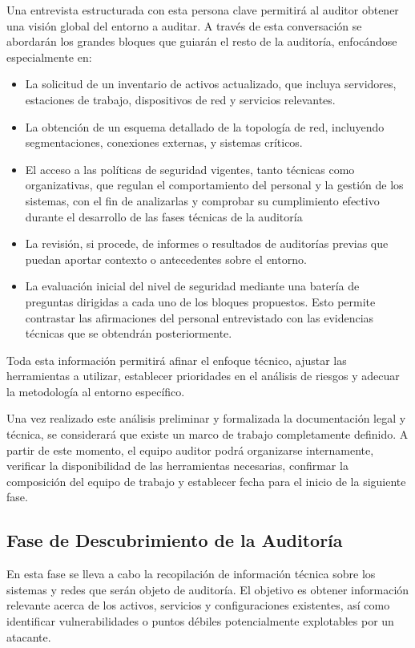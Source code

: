 \documentclass[a4paper, 11pt]{article}
\begin{document}
Una entrevista estructurada con esta persona clave permitirá al auditor obtener una visión global del entorno a auditar. A través de esta conversación se abordarán los grandes bloques que guiarán el resto de la auditoría, enfocándose especialmente en:

\begin{itemize}
\item La solicitud de un inventario de activos actualizado, que incluya servidores, estaciones de trabajo, dispositivos de red y servicios relevantes.
\item La obtención de un esquema detallado de la topología de red, incluyendo segmentaciones, conexiones externas, y sistemas críticos.
\item El acceso a las políticas de seguridad vigentes, tanto técnicas como organizativas, que regulan el comportamiento del personal y la gestión de los sistemas, con el fin de analizarlas y comprobar su cumplimiento
efectivo durante el desarrollo de las fases técnicas de la auditoría
\item La revisión, si procede, de informes o resultados de auditorías previas que puedan aportar contexto o antecedentes sobre el entorno.
\item La evaluación inicial del nivel de seguridad mediante una batería de preguntas dirigidas a cada uno de los bloques propuestos. Esto permite contrastar las afirmaciones del personal entrevistado con las evidencias técnicas que se obtendrán posteriormente.
\end{itemize}

Toda esta información permitirá afinar el enfoque técnico, ajustar las herramientas a utilizar, establecer prioridades en el análisis de riesgos y adecuar la metodología al entorno específico.


Una vez realizado este análisis preliminar y formalizada la documentación legal y técnica, se considerará que existe un marco de trabajo completamente definido. A partir de este momento, el equipo auditor podrá organizarse internamente, verificar la disponibilidad de las herramientas necesarias, confirmar la composición del equipo de trabajo y establecer fecha para el inicio de la siguiente fase.



\subsection{Fase de Descubrimiento de la Auditoría}


En esta fase se lleva a cabo la recopilación de información técnica sobre los sistemas y redes que serán objeto de auditoría. El objetivo es obtener información relevante acerca de los activos, servicios y configuraciones existentes, así como identificar vulnerabilidades o puntos débiles potencialmente explotables por un atacante.
\end{document}
